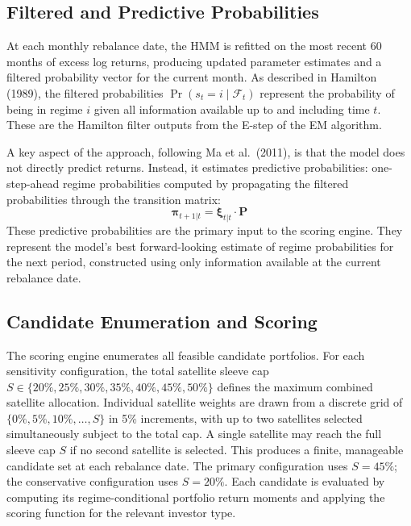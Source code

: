 \documentclass[12pt, a4paper]{article}
\begin{document}
\subsection{Filtered and Predictive Probabilities}

At each monthly rebalance date, the HMM is refitted on the most recent 60 months of excess
log returns, producing updated parameter estimates and a filtered probability vector for the
current month. As described in Hamilton (1989), the filtered probabilities
$\Pr(s_t = i \mid \mathcal{F}_t)$ represent the probability of being in regime $i$ given all
information available up to and including time $t$. These are the Hamilton filter outputs from
the E-step of the EM algorithm.

A key aspect of the approach, following Ma et al.\ (2011), is that the model does not directly
predict returns. Instead, it estimates predictive probabilities: one-step-ahead regime
probabilities computed by propagating the filtered probabilities through the transition matrix:
\begin{equation}
  \boldsymbol{\pi}_{t+1|t} = \boldsymbol{\xi}_{t|t} \cdot \mathbf{P}
\end{equation}
These predictive probabilities are the primary input to the scoring engine. They represent
the model's best forward-looking estimate of regime probabilities for the next period,
constructed using only information available at the current rebalance date.

\subsection{Candidate Enumeration and Scoring}

The scoring engine enumerates all feasible candidate portfolios. For each sensitivity
configuration, the total satellite sleeve cap $S \in \{20\%,25\%,30\%,35\%,40\%,45\%,50\%\}$
defines the maximum combined satellite allocation. Individual satellite weights are drawn
from a discrete grid of $\{0\%,5\%,10\%,\ldots,S\}$ in 5\% increments, with up to two
satellites selected simultaneously subject to the total cap. A single satellite may reach
the full sleeve cap $S$ if no second satellite is selected. This produces a finite,
manageable candidate set at each rebalance date. The primary configuration uses $S=45\%$;
the conservative configuration uses $S=20\%$. Each candidate is evaluated by computing its
regime-conditional portfolio return moments and applying the scoring function for the relevant
investor type.
\end{document}
